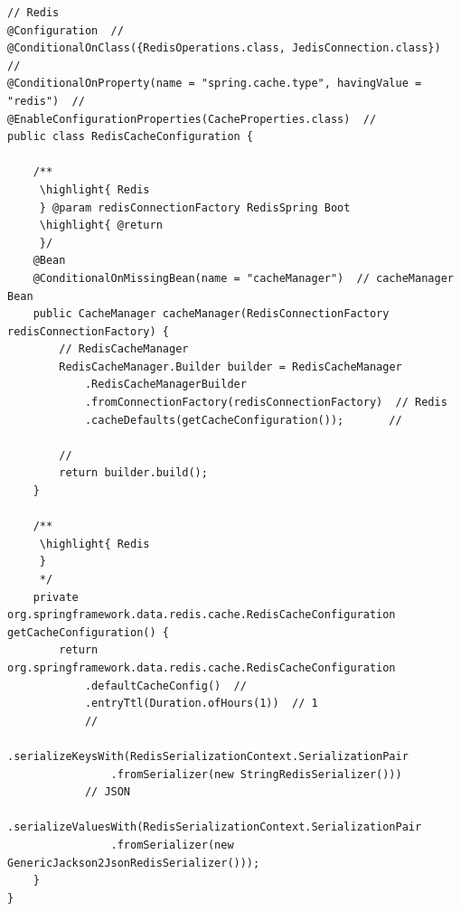 \begin{lstlisting}[style=java]
// Redis
@Configuration  // 
@ConditionalOnClass({RedisOperations.class, JedisConnection.class})  // 
@ConditionalOnProperty(name = "spring.cache.type", havingValue = "redis")  // 
@EnableConfigurationProperties(CacheProperties.class)  // 
public class RedisCacheConfiguration {
    
    /**
     \highlight{ Redis
     } @param redisConnectionFactory RedisSpring Boot
     \highlight{ @return 
     }/
    @Bean
    @ConditionalOnMissingBean(name = "cacheManager")  // cacheManager Bean
    public CacheManager cacheManager(RedisConnectionFactory redisConnectionFactory) {
        // RedisCacheManager
        RedisCacheManager.Builder builder = RedisCacheManager
            .RedisCacheManagerBuilder
            .fromConnectionFactory(redisConnectionFactory)  // Redis
            .cacheDefaults(getCacheConfiguration());       // 
        
        // 
        return builder.build();
    }
    
    /**
     \highlight{ Redis
     } 
     */
    private org.springframework.data.redis.cache.RedisCacheConfiguration getCacheConfiguration() {
        return org.springframework.data.redis.cache.RedisCacheConfiguration
            .defaultCacheConfig()  // 
            .entryTtl(Duration.ofHours(1))  // 1
            // 
            .serializeKeysWith(RedisSerializationContext.SerializationPair
                .fromSerializer(new StringRedisSerializer()))
            // JSON
            .serializeValuesWith(RedisSerializationContext.SerializationPair
                .fromSerializer(new GenericJackson2JsonRedisSerializer()));
    }
}
\end{lstlisting}

\important{}

